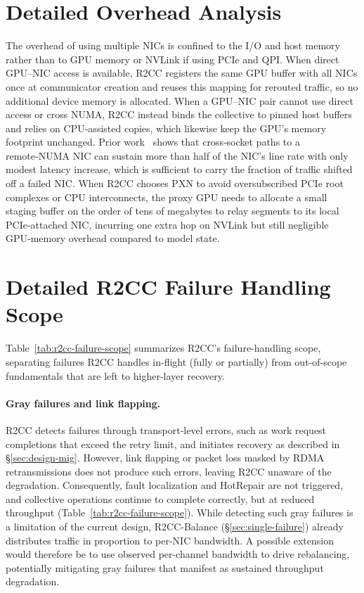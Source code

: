 \section{Detailed Overhead Analysis}\label{appendix:overhead}

The overhead of using multiple NICs is confined to the I/O and host memory rather than to GPU memory or NVLink if using PCIe and QPI. When direct GPU–NIC access is available, R2CC registers the same GPU buffer with all NICs once at communicator creation and reuses this mapping for rerouted traffic, so no additional device memory is allocated. When a GPU–NIC pair cannot use direct access or cross NUMA, R2CC instead binds the collective to pinned host buffers and relies on CPU‑assisted copies, which likewise keep the GPU’s memory footprint unchanged. Prior work~\cite{liu2023hostping} shows that cross‑socket paths to a remote‑NUMA NIC can sustain more than half of the NIC’s line rate with only modest latency increase, which is sufficient to carry the fraction of traffic shifted off a failed NIC. When R2CC chooses PXN to avoid oversubscribed PCIe root complexes or CPU interconnects, the proxy GPU needs to allocate a small staging buffer on the order of tens of megabytes to relay segments to its local PCIe‑attached NIC, incurring one extra hop on NVLink but still negligible GPU‑memory overhead compared to model state.

\section{Detailed R2CC Failure Handling Scope}\label{app:failure-scope}

Table~\ref{tab:r2cc-failure-scope} summarizes R2CC's failure-handling scope, separating failures R2CC handles in-flight (fully or partially) from out-of-scope fundamentals that are left to higher-layer recovery.

\paragraph{Gray failures and link flapping.}\label{app:gray-failure}
R2CC detects failures through transport-level errors, such as work request completions that exceed the retry limit, and initiates recovery as described in \S\ref{sec:design-mig}. However, link flapping or packet loss masked by RDMA retransmissions does not produce such errors, leaving R2CC unaware of the degradation. Consequently, fault localization and HotRepair are not triggered, and collective operations continue to complete correctly, but at reduced throughput (Table~\ref{tab:r2cc-failure-scope}).
While detecting such gray failures is a limitation of the current design, R2CC-Balance (\S\ref{sec:single-failure}) already distributes traffic in proportion to per-NIC bandwidth. A possible extension would therefore be to use observed per-channel bandwidth to drive rebalancing, potentially mitigating gray failures that manifest as sustained throughput degradation.

